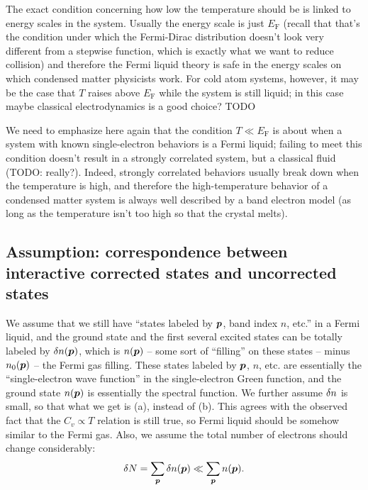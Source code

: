 \documentclass[hyperref, a4paper]{article}
\newcommand*{\efermi}{E_{\text{F}}}
\begin{document}
The exact condition concerning how low the temperature should be 
is linked to energy scales in the system.
Usually the energy scale is just $\efermi$
(recall that that's the condition 
under which the Fermi-Dirac distribution doesn't look very different
from a stepwise function, 
which is exactly what we want to reduce collision) 
and therefore the Fermi liquid theory is safe 
in the energy scales on which condensed matter physicists work.
For cold atom systems, however, 
it may be the case that $T$ raises above $\efermi$ 
while the system is still liquid; 
in this case maybe classical electrodynamics is a good choice? TODO

We need to emphasize here again 
that the condition $T \ll \efermi$
is about when a system with known single-electron behaviors 
is a Fermi liquid;
failing to meet this condition 
doesn't result in a strongly correlated system, 
but a classical fluid (TODO: really?).
Indeed, strongly correlated behaviors usually break down 
when the temperature is high, 
and therefore the high-temperature behavior 
of a condensed matter system 
is always well described by a band electron model 
(as long as the temperature isn't too high 
so that the crystal melts).

\subsection{Assumption: correspondence between interactive corrected states and uncorrected states}

We assume that we still have ``states labeled by $\vb*{p}$, band index $n$, etc.'' 
in a Fermi liquid,
and the ground state and the first several excited states 
can be totally labeled by $\var{n(\vb*{p})}$,
which is $n(\vb*{p})$ -- some sort of ``filling'' on these states -- 
minus $n_0(\vb*{p})$ -- the Fermi gas filling. 
These states labeled by $\vb*{p}$, $n$, etc. 
are essentially the ``single-electron wave function''
in the single-electron Green function, 
and the ground state $n(\vb*{p})$ is essentially the spectral function.
We further assume $\var{n}$ is small, so that what we get is (a),
instead of (b).
This agrees with the observed fact that the $C_v \propto T$ relation is still true,
so Fermi liquid should be somehow similar to the Fermi gas. 
Also, we assume the total number of electrons 
should change considerably:
\begin{equation}
    \var{N} = \sum_{\vb*{p}} \var{n(\vb*{p})} \ll \sum_{\vb*{p}} n(\vb*{p}). 
\end{equation}
\end{document}
